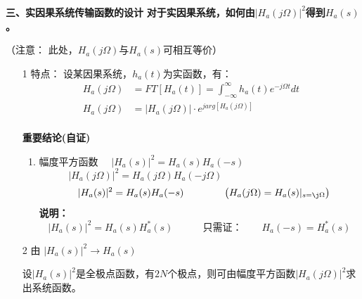 \documentclass[notheorems,compress,mathserif,table]{beamer}
\begin{document}
\begin{frame}[allowframebreaks]\frametitle{}%
\textbf{三、实因果系统传输函数的设计}
\textbf{对于实因果系统，如何由$|H_a(j\Omega)|^2$得到$H_a(s)$。}
\par （注意： 此处，$H_a(j\Omega)$与$H_a(s)$可相互等价）
\begin{enumerate}
  \item [1] 特点：
      设某因果系统，$h_a(t)$为实函数，有：
      \begin{equation*} 
        \begin{split}
        H_{a}(j\Omega)&= FT[H_{a}(t)] = \int_{-\infty}^{\infty}h_{a}(t)e^{-j\Omega t}dt \\
         H_{a}(j\Omega)&=|H_{a}(j\Omega)|\cdot e^{jarg[H_{a}(j\Omega)]}\\
        \end{split}
      \end{equation*}
   \newpage

      \textbf{重要结论(自证)}
      \begin{enumerate}
        \item  幅度平方函数  $\quad |H_{a}(s)|^{2}=H_{a}(s)H_{a}(-s)$
            $$|H_{a}(j\Omega)|^{2}=H_{a}(j\Omega)H_{a}(-j\Omega)\quad\quad\quad\quad\quad\quad\quad\quad\quad\quad\quad$$
            $$\quad |H_{a}(s)|^{2}=H_{a}(s)H_{a}(-s)  \quad\quad\quad\quad   \left(H_{a}(j\Omega)= H_{a}(s)|_{s=\j\Omega}\right)$$
            \textbf{说明：}
            $$|H_{a}(s)|^{2}=H_{a}(s)H_{a}^{*}(s)      \quad\quad\quad \mbox{只需证：}\quad\quad    H_{a}(-s)=H_{a}^{*}(s)  $$

      \end{enumerate}



  \item [2]  由
            \quad $|H_{a}(s)|^{2}\rightarrow H_{a}(s)$
            \newline
            \par 设$|H_{a}(s)|^{2}$是全极点函数，有$2N$个极点，则可由幅度平方函数$|H_{a}(j\Omega)|^{2}$求出系统函数。


\end{enumerate}
\end{frame}
\end{document}
